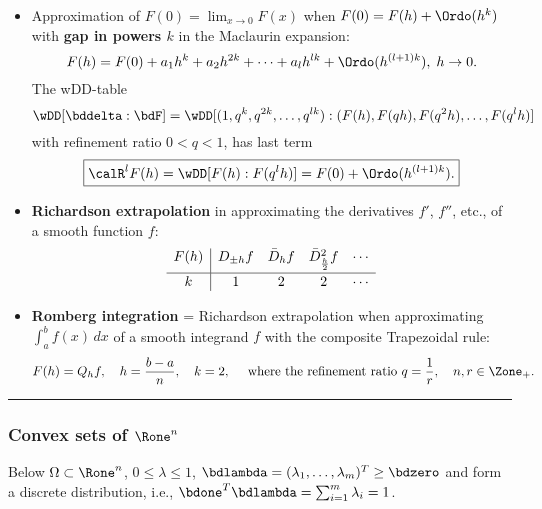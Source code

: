 \documentclass[a4paper]{article}
\begin{document}
\begin{itemize}
\item
Approximation of $F(0)=\lim_{x\to0}F(x)$ when $F(0)=F(h) + \Ordo(h^k)$ with
\textbf{gap in powers $k$} in the Maclaurin expansion:
\[
  F(h) = F(0) + a_1h^k+a_2h^{2k}+\cdots+a_lh^{lk} + \Ordo(h^{(l+1)k}),\; h\to 0.
\]
The  wDD-table
\[
  \wDD[\bddelta:\bdF]
  =\wDD[(1,q^k,q^{2k},\ldots,q^{lk}):(F(h),F(qh),F(q^2h),\ldots,F(q^lh)]
\]
 with refinement ratio $0<q<1$, has last term
\[
  \boxed{\calR^lF(h)=\wDD[F(h):F(q^lh)]=F(0) + \Ordo(h^{(l+1)k}).}
\]

  \item \textbf{Richardson extrapolation}
    in approximating the derivatives $f'$, $f''$, etc., of a smooth function $f$:
    \[
    \begin{array}{c|*{5}{c}}
      F(h) & D_{\pm h}f & \bar D_hf & \bar D^2_{\frac h2}f & \cdots \\[5pt]
      \hline \rule[0pt]{0pt}{9pt}
      k & 1 & 2 & 2 & \cdots \\
    \end{array}
  \]
  \item \textbf{Romberg integration} = Richardson extrapolation
    when approximating $\int_a^b \!\! f(x)\,dx$ of a smooth integrand $f$ with the
    composite Trapezoidal rule:
    \[
      F(h)=Q_hf,\quad
      h=\frac{b-a}{n},\quad
      k=2,\quad
      ~\text{where the refinement ratio}~
      q=\frac1r,\quad
      n,r\in\Zone_+.
    \]
\end{itemize}


\medskip\hrule


\subsubsection*{Convex sets of $\Rone^n$}%

Below
$\Omega\subset\Rone^n$,
$0\le \lambda\le 1$,
$\bdlambda=(\lambda_1,\ldots,\lambda_m)^T\ge\bdzero$
and form a discrete distribution, i.e.,
$\bdone^T\bdlambda=\sum_{i=1}^m \lambda_i=1$.
\end{document}
